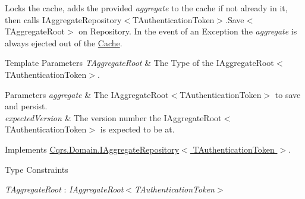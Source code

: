 Locks the cache, adds the provided {\itshape aggregate}  to the cache if not already in it, then calls I\+Aggregate\+Repository$<$\+T\+Authentication\+Token$>$.\+Save$<$\+T\+Aggregate\+Root$>$ on Repository. In the event of an Exception the {\itshape aggregate}  is always ejected out of the \hyperlink{namespaceCqrs_1_1Cache}{Cache}. 


\begin{DoxyTemplParams}{Template Parameters}
{\em T\+Aggregate\+Root} & The Type of the I\+Aggregate\+Root$<$\+T\+Authentication\+Token$>$.\\
\hline
\end{DoxyTemplParams}

\begin{DoxyParams}{Parameters}
{\em aggregate} & The I\+Aggregate\+Root$<$\+T\+Authentication\+Token$>$ to save and persist.\\
\hline
{\em expected\+Version} & The version number the I\+Aggregate\+Root$<$\+T\+Authentication\+Token$>$ is expected to be at.\\
\hline
\end{DoxyParams}


Implements \hyperlink{interfaceCqrs_1_1Domain_1_1IAggregateRepository_a306baf8aa6faabe893f93e5db5d3517d_a306baf8aa6faabe893f93e5db5d3517d}{Cqrs.\+Domain.\+I\+Aggregate\+Repository$<$ T\+Authentication\+Token $>$}.

\begin{Desc}
\item[Type Constraints]\begin{description}
\item[{\em T\+Aggregate\+Root} : {\em I\+Aggregate\+Root$<$T\+Authentication\+Token$>$}]\end{description}
\end{Desc}
